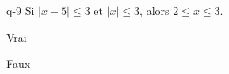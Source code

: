 \begin{truefalse}{q-9}
Si $|x-5|\leq 3$ et $|x|\leq 3$, alors $2\leq x \leq 3$.
\item* Vrai
\item Faux
\end{truefalse}

